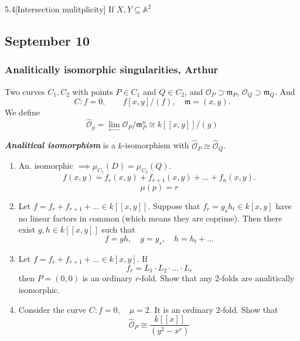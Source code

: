 \begin{manualexercise}{5.4}[Intersection mulitplicity]
	If $X,Y\subseteq \mathbb{A}^{2} $
\end{manualexercise}

\subsection{September 10}

\subsubsection{Analitically isomorphic singularities, Arthur}
Two curves $C_1,C_2$ with points $P \in C_1$ and $Q\in C_2$, and $\mathcal{O}_P\supset\mathfrak{m}_P$, $\mathcal{O}_Q\supset\mathfrak{m}_Q$. And
\[C:f=0,\qquad f[x,y]/(f), \quad \mathfrak{m}=(x,y).\]
We define
\[\hat{\mathcal{O}}_p=\lim_{\longleftarrow} \mathcal{O}_P/\mathfrak{m}^n_P\cong k[ [x,y]]/(y)\]

\begin{defn}
	\textit{\textbf{Analitical isomorphism}} is a $k$-isomorphism with $\hat{\mathcal{O}}_P\cong \hat{\mathcal{O}}_Q$.
\end{defn}

\begin{manualexercise}{}
	\begin{enumerate}[label=\alph*.]
		\item An. isomorphic $\implies \mu_{C_1}(D)=\mu_{C_2}(Q)$.
\[f(x,y)=f_r(x,y)+f_{r+1}(x,y)+\ldots+f_n(x,y).\]
\[\mu(p)=r\]

\item Let $f=f_r+f_{r+1}+\ldots\in k[[x,y]]$. Suppose that $f_r=g_s h_t\in k[x,y]$ have no linear factors in common (which means they are coprime). Then there exist $g,h\in k[ [ x,y] ]$ such that
	\[f=gh,\quad g=g_s,\quad h=h_t+\ldots\]

	\item Let $f=f_r+f_{r+1}+\ldots\in k[x,y]$. If
		\[f_r=L_1\cdot L_2\cdot \ldots\cdot L_r\]
		then $P=(0,0)$ is an ordinary $r$-fold. Show that any 2-folds are analitically isomorphic.

		\item Consider the curve $C:f=0,\quad \mu=2$. It is an ordinary 2-fold. Show that
			\[\hat{\mathcal{O}}_P\cong \frac{k[ [ x] ]}{(y^2-x^r)}\]
	\end{enumerate}
\end{manualexercise}

